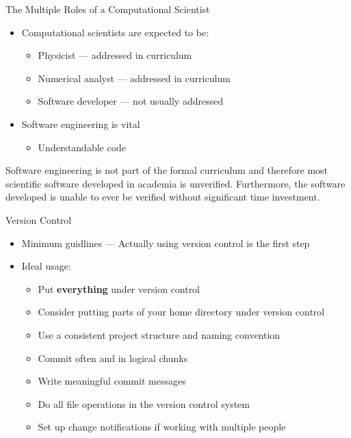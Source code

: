 \documentclass[onlymath, nologo]{beamer}
\begin{document}
  \begin{frame}{The Multiple Roles of a Computational Scientist}
    \begin{itemize}
      \item Computational scientists are expected to be:
        \begin{itemize}
          \item Physicist --- addressed in curriculum  \\[0.5em]
          \item Numerical analyst --- addressed in curriculum  \\[0.5em]
          \item Software developer --- not usually addressed
        \end{itemize}
      \item Software engineering is vital
        \begin{itemize}
          \item Understandable code
        \end{itemize}
    \end{itemize}
    \begin{tcolorbox}[title=Software engineering gap, arc is angular]
      Software engineering is not part of the formal curriculum and therefore 
      most scientific software developed in academia is unverified.  Furthermore, 
      the software developed is unable to ever be verified without significant 
      time investment.
    \end{tcolorbox}
  \end{frame}

  \begin{frame}{Version Control}
    \begin{itemize}
      \item Minimum guidlines --- Actually using version control is the first step \\[1.0em]
      \item Ideal usage:
        \begin{itemize}
          \item Put \textbf{everything} under version control \\[0.5em]
          \item Consider putting parts of your home directory under version control \\[0.5em]
          \item Use a consistent project structure and naming convention \\[0.5em]
          \item Commit often and in logical chunks \\[0.5em]
          \item Write meaningful commit messages \\[0.5em]
          \item Do all file operations in the version control system \\[0.5em]
          \item Set up change notifications if working with multiple people
        \end{itemize}
    \end{itemize}
  \end{frame}
\end{document}
